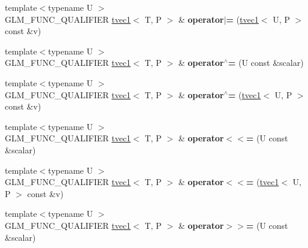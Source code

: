 \begin{DoxyCompactItemize}
\item 
\hypertarget{structglm_1_1tvec1_ad748418051a8d9b414a0fddbbc02d5b6}{{\footnotesize template$<$typename U $>$ }\\G\-L\-M\-\_\-\-F\-U\-N\-C\-\_\-\-Q\-U\-A\-L\-I\-F\-I\-E\-R \hyperlink{structglm_1_1tvec1}{tvec1}$<$ T, P $>$ \& {\bfseries operator$\vert$=} (\hyperlink{structglm_1_1tvec1}{tvec1}$<$ U, P $>$ const \&v)}\label{structglm_1_1tvec1_ad748418051a8d9b414a0fddbbc02d5b6}

\item 
\hypertarget{structglm_1_1tvec1_a1fadde3f65b74863529f879c81b98ce6}{{\footnotesize template$<$typename U $>$ }\\G\-L\-M\-\_\-\-F\-U\-N\-C\-\_\-\-Q\-U\-A\-L\-I\-F\-I\-E\-R \hyperlink{structglm_1_1tvec1}{tvec1}$<$ T, P $>$ \& {\bfseries operator$^\wedge$=} (U const \&scalar)}\label{structglm_1_1tvec1_a1fadde3f65b74863529f879c81b98ce6}

\item 
\hypertarget{structglm_1_1tvec1_ac0eea05981ed38c5f1eca0db90d4d768}{{\footnotesize template$<$typename U $>$ }\\G\-L\-M\-\_\-\-F\-U\-N\-C\-\_\-\-Q\-U\-A\-L\-I\-F\-I\-E\-R \hyperlink{structglm_1_1tvec1}{tvec1}$<$ T, P $>$ \& {\bfseries operator$^\wedge$=} (\hyperlink{structglm_1_1tvec1}{tvec1}$<$ U, P $>$ const \&v)}\label{structglm_1_1tvec1_ac0eea05981ed38c5f1eca0db90d4d768}

\item 
\hypertarget{structglm_1_1tvec1_ae56a8ca9dbe1e1d0b05e1dd020f7806b}{{\footnotesize template$<$typename U $>$ }\\G\-L\-M\-\_\-\-F\-U\-N\-C\-\_\-\-Q\-U\-A\-L\-I\-F\-I\-E\-R \hyperlink{structglm_1_1tvec1}{tvec1}$<$ T, P $>$ \& {\bfseries operator$<$$<$=} (U const \&scalar)}\label{structglm_1_1tvec1_ae56a8ca9dbe1e1d0b05e1dd020f7806b}

\item 
\hypertarget{structglm_1_1tvec1_a758704df3a9b6ecab58bcfa9baf7582b}{{\footnotesize template$<$typename U $>$ }\\G\-L\-M\-\_\-\-F\-U\-N\-C\-\_\-\-Q\-U\-A\-L\-I\-F\-I\-E\-R \hyperlink{structglm_1_1tvec1}{tvec1}$<$ T, P $>$ \& {\bfseries operator$<$$<$=} (\hyperlink{structglm_1_1tvec1}{tvec1}$<$ U, P $>$ const \&v)}\label{structglm_1_1tvec1_a758704df3a9b6ecab58bcfa9baf7582b}

\item 
\hypertarget{structglm_1_1tvec1_abaf53db5e459c33cbaac2658b68585a4}{{\footnotesize template$<$typename U $>$ }\\G\-L\-M\-\_\-\-F\-U\-N\-C\-\_\-\-Q\-U\-A\-L\-I\-F\-I\-E\-R \hyperlink{structglm_1_1tvec1}{tvec1}$<$ T, P $>$ \& {\bfseries operator$>$$>$=} (U const \&scalar)}\label{structglm_1_1tvec1_abaf53db5e459c33cbaac2658b68585a4}


\end{DoxyCompactItemize}

